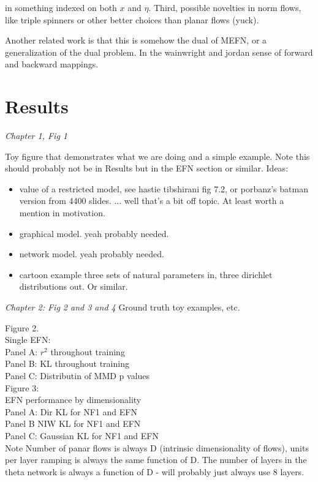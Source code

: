 \documentclass{article}
\begin{document}
in something indexed on both $x$ and $\eta$.  Third, possible novelties in norm flows, like triple spinners or other better choices than planar flows (yuck).

Another related work is that this is somehow the dual of MEFN, or a generalization of the dual problem.  In the wainwright and jordan sense of forward and backward mappings.
  
  
  \section{Results}

\emph{Chapter 1, Fig 1}
 
Toy figure that demonstrates what we are doing and a simple example.  Note this should probably not be in Results but in the EFN section or similar.  Ideas:
\begin{itemize}
\item value of a restricted model, see hastie tibshirani fig 7.2, or porbanz's batman version from 4400 slides.  ... well that's a bit off topic.  At least worth a mention in motivation.
\item graphical model.  yeah probably needed.
\item network model.  yeah probably needed.
\item cartoon example three sets of natural parameters in, three dirichlet distributions out.  Or similar.
\end{itemize}


 \emph{Chapter 2: Fig 2 and 3 and 4}
 Ground truth toy examples, etc. 
 
Figure 2. \\
Single EFN: \\
Panel A:  $r^2$ throughout training \\
Panel B: KL throughout training \\ 
Panel C: Distributin of MMD p values \\


Figure 3: \\
EFN performance by dimensionality \\
Panel A: Dir KL for NF1 and EFN \\
Panel B NIW KL for NF1 and EFN \\
Panel C: Gaussian KL for NF1 and EFN \\

Note Number of panar flows is always D (intrinsic dimensionality of flows), units per layer ramping is always the same function of D.  The number of layers in the theta network is always a function of D - will probably just always use 8 layers. \\
\end{document}
